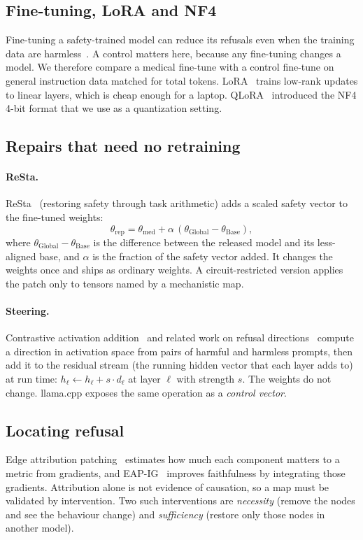 \documentclass[runningheads]{llncs}
\begin{document}
\subsection{Fine-tuning, LoRA and NF4}
Fine-tuning a safety-trained model can reduce its refusals even when the training data are harmless~\cite{qi2024}. A control matters here, because any fine-tuning changes a model. We therefore compare a medical fine-tune with a control fine-tune on general instruction data matched for total tokens. LoRA~\cite{lora} trains low-rank updates to linear layers, which is cheap enough for a laptop. QLoRA~\cite{qlora} introduced the NF4 4-bit format that we use as a quantization setting.

\subsection{Repairs that need no retraining}
\paragraph{ReSta.} ReSta~\cite{resta} (restoring safety through task arithmetic) adds a scaled safety vector to the fine-tuned weights:
\begin{equation}
\theta_{\mathrm{rep}} = \theta_{\mathrm{med}} + \alpha\,(\theta_{\mathrm{Global}} - \theta_{\mathrm{Base}}),
\end{equation}
where $\theta_{\mathrm{Global}} - \theta_{\mathrm{Base}}$ is the difference between the released model and its less-aligned base, and $\alpha$ is the fraction of the safety vector added. It changes the weights once and ships as ordinary weights. A circuit-restricted version applies the patch only to tensors named by a mechanistic map.

\paragraph{Steering.} Contrastive activation addition~\cite{caa} and related work on refusal directions~\cite{arditi} compute a direction in activation space from pairs of harmful and harmless prompts, then add it to the residual stream (the running hidden vector that each layer adds to) at run time:
$h_\ell \leftarrow h_\ell + s \cdot d_\ell$ at layer $\ell$ with strength $s$. The weights do not change. llama.cpp exposes the same operation as a \emph{control vector}.

\subsection{Locating refusal}
Edge attribution patching~\cite{eap} estimates how much each component matters to a metric from gradients, and EAP-IG~\cite{eapig} improves faithfulness by integrating those gradients. Attribution alone is not evidence of causation, so a map must be validated by intervention. Two such interventions are \emph{necessity} (remove the nodes and see the behaviour change) and \emph{sufficiency} (restore only those nodes in another model).
\end{document}

